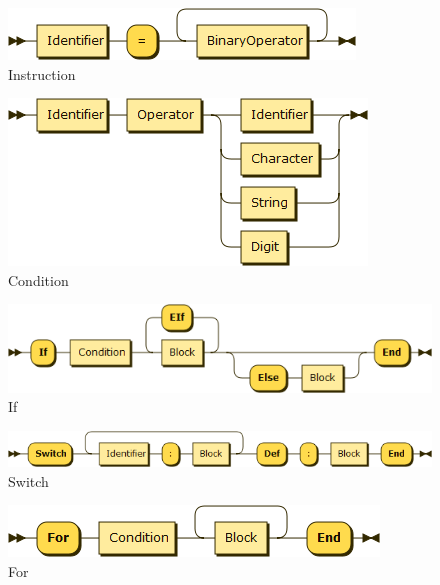 \begin{figure}[h!]
\centering
\includegraphics[scale=0.7]{kepek/rr_instruction.png}
\caption{Instruction}
\label{fig:rr_instruction}
\end{figure}

\begin{figure}[h!]
\centering
\includegraphics[scale=0.4]{kepek/rr_condition.png}
\caption{Condition}
\label{fig:rr_condition}
\end{figure}

\begin{figure}[h!]
\centering
\includegraphics[scale=0.4]{kepek/rr_if.png}
\caption{If}
\label{fig:rr_if}
\end{figure}

\begin{figure}[h!]
\centering
\includegraphics[scale=0.4]{kepek/rr_switch.png}
\caption{Switch}
\label{fig:rr_switch}
\end{figure}

\begin{figure}[h!]
\centering
\includegraphics[scale=0.4]{kepek/rr_for.png}
\caption{For}
\label{fig:rr_for}
\end{figure}

